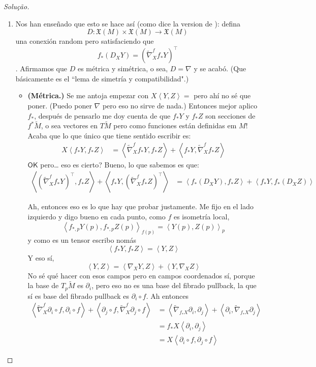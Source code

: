 \begin{proof}[Solução]\leavevmode
\begin{enumerate}[label=(\alph*)]
\item Nos han enseñado que esto se hace así (como dice la version de \cite{daj}): defina
	\[D: \mathfrak{X}(M)\times \mathfrak{X}(M) \longrightarrow \mathfrak{X}(M)\]
una conexión random pero satisfaciendo que
\[f_*(D_XY) = \left(\widetilde{\nabla}_X^f f_*Y\right)^\top\]
. Afirmamos que \(D\) es métrica y simétrica, o sea, \(D=\nabla\) y se acabó. (Que básicamente es el ``lema de simetría y compatibilidad".)
\begin{itemize}
\item \textbf{(Métrica.)} Se me antoja empezar con \(X\left<Y,Z\right>=\) pero ahí no sé que poner. (Puedo poner \(\nabla\) pero eso no sirve de nada.) Entonces mejor aplico \(f_*\), después de pensarlo me doy cuenta de que \(f_*Y\) y \(f_*Z\) son secciones de \(f^*\widetilde{M}\), o sea vectores en \(T\widetilde{M}\) pero como funciones están definidas em \(M\)! Acaba que lo que único que tiene sentido escribir es:
\begin{align*}
X\left<f_*Y,f_*Z\right>&=\left<\widetilde{\nabla}^f_Xf_*Y,f_*Z\right>+\left<f_*Y,\widetilde{\nabla}^f_Xf_*Z\right>
\end{align*}
\(\mathsf{OK}\) pero… eso es cierto? Bueno, lo que sabemos es que:
\begin{align*}
\left<\left( \widetilde{\nabla}^f_Xf_*Y\right)^\top,f_*Z\right>+\left<f_*Y,\left(\widetilde{\nabla}^f_Xf_*Z\right)^\top\right>&=\left<f_*(D_XY),f_*Z\right>+\left<f_*Y,f_*(D_XZ)\right>
\end{align*}



Ah, entonces eso es lo que hay que probar justamente. Me fijo en el lado izquierdo y digo bueno en cada punto, como \(f\) es isometría local,
\[\left<f_{*,p}Y(p),f_{*,p}Z(p)\right>_{f(p)}=\left<Y(p),Z(p)\right>_{p}\]
y como es un tensor escribo nomás
\[\left<f_*Y,f_*Z\right>=\left<Y,Z\right>\]
Y eso sí,
\[\left<Y,Z\right>=\left<\nabla_XY,Z\right>+\left<Y,\nabla_XZ\right>\]
No sé qué hacer con esos campos pero en campos coordenados sí, porque la base de  \(T_p\widetilde{M}\) es \(\partial_i\), pero eso no es una base del fibrado pullback, la que sí es base del fibrado pullback es \(\partial_i \circ f\). Ah entonces
\begin{align*}
\left<\widetilde{\nabla}_X^f \partial_i \circ f,\partial_i \circ f\right>+\left<\partial_j \circ f,\widetilde{\nabla}_X^f \partial_j \circ f\right>&= \left<\tilde{\nabla}_{f_*X}\partial_i,\partial_j\right>+\left<\partial_i,\widetilde{\nabla}_{f_* X}\partial_j\right>\\
&=f_*X\left<\partial_i, \partial_j\right>\\
&=X\left<\partial_i \circ f,\partial_j \circ f\right>
\end{align*}
\end{itemize}

\end{enumerate}
\end{proof}

